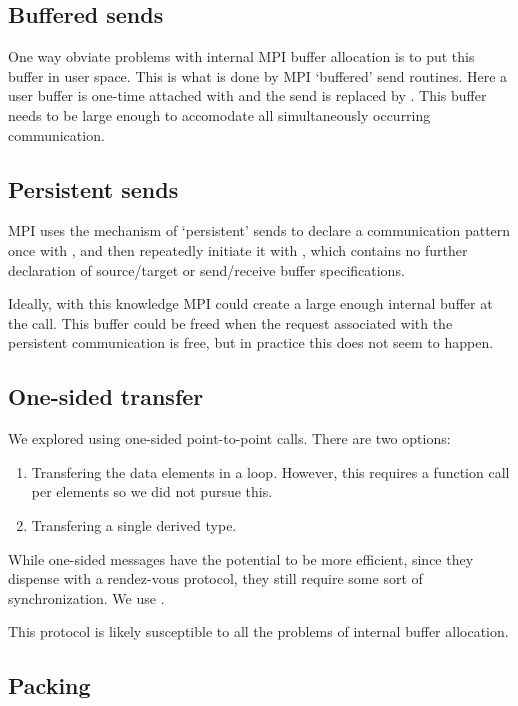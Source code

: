 \subsection{Buffered sends}

One way obviate problems with internal MPI buffer allocation
is to put this buffer in user space. This is what is done
by MPI `buffered' send routines.
Here a user buffer is one-time attached with
 and the send is replaced by .
This buffer needs to be large enough to accomodate all simultaneously
occurring communication.

\subsection{Persistent sends}

MPI uses the mechanism of `persistent' sends to declare a communication
pattern once with ,
and then repeatedly initiate it with ,
which contains no further declaration of source/target or
send/receive buffer specifications.

Ideally, with this knowledge MPI could create a large enough
internal buffer at the  call.
This buffer could be freed when the request associated
with the persistent communication is free,
but in practice this does not seem to happen.

\subsection{One-sided transfer}

We explored using one-sided point-to-point calls. There are two options:
\begin{enumerate}
\item Transfering the data elements in a loop. However, this requires
  a function call per elements so we did not pursue this.
\item Transfering a single derived type.
\end{enumerate}

While one-sided messages have the potential to be more efficient,
since they dispense with a rendez-vous protocol, they still require
some sort of synchronization. We use .

This protocol is likely susceptible to all the problems
of internal buffer allocation.

\subsection{Packing}

